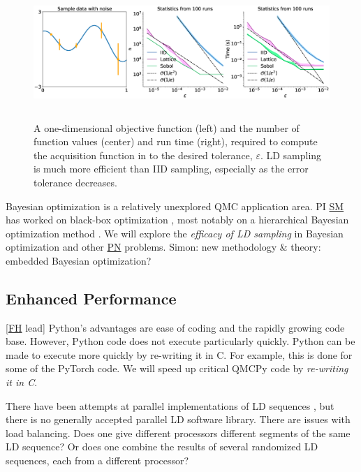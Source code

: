 \documentclass[11pt]{NSFamsart}
\newcommand{\FH}{\hyperlink{FHlink}{FH}\xspace}
\newcommand{\SM}{\hyperlink{SMlink}{SM}\xspace}
\newcommand{\PN}{\hyperlink{PNlink}{PN}\xspace}
\newcommand{\SMNote}[1]{{\color{blue}Simon: #1}}
\begin{document}
\begin{figure}[h]
	\centering
	\includegraphics[height = 5cm]{ProgramsImages/qEI_cost_comp_time.eps}
	\caption{A one-dimensional objective function (left) and the number of function values (center) and run time (right), required to compute the acquisition function in \cite[qEI with QMCPy]{QMCBlog} to the desired tolerance, $\varepsilon$.  LD sampling is much more efficient than IID sampling, especially as the error tolerance decreases.}
	\label{fig:qei}
\end{figure}

Bayesian optimization is a relatively unexplored QMC application area. PI \SM has worked on black-box optimization \cite{mak2019analysis,chen2019hierarchical}, most notably on a hierarchical Bayesian optimization method \cite{chen2019hierarchical}. We will explore the \emph{efficacy of LD sampling} in Bayesian optimization and other \PN problems. \SMNote{new methodology \& theory: embedded Bayesian optimization?}



\subsection{Enhanced Performance} [\FH lead]
Python's advantages are ease of coding and the rapidly growing code base.  However, Python code does not execute particularly quickly.  Python can be made to execute more quickly by re-writing it in C.  For example, this is done for some of the PyTorch code.  We will speed up critical QMCPy code by \emph{re-writing it in C}.

There have been attempts at parallel implementations of LD sequences \cite{LiMul00a,OktSri02, SchUhl01,WanEtal06a,LiuHic04a}, but there is no generally accepted parallel LD software library.  There are issues with load balancing.  Does one give different processors different segments of the same LD sequence?  Or does one combine the results of several randomized LD sequences, each from a different processor?
\end{document}
